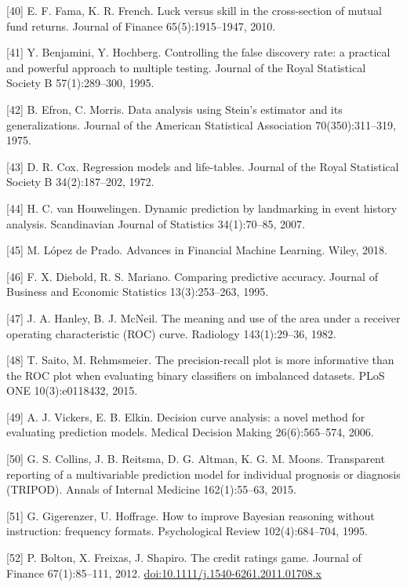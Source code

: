 {[}40{]} E. F. Fama, K. R. French. Luck versus skill in the cross-section of mutual fund returns. Journal of Finance 65(5):1915--1947, 2010.

{[}41{]} Y. Benjamini, Y. Hochberg. Controlling the false discovery rate: a practical and powerful approach to multiple testing. Journal of the Royal Statistical Society B 57(1):289--300, 1995.

{[}42{]} B. Efron, C. Morris. Data analysis using Stein's estimator and its generalizations. Journal of the American Statistical Association 70(350):311--319, 1975.

{[}43{]} D. R. Cox. Regression models and life-tables. Journal of the Royal Statistical Society B 34(2):187--202, 1972.

{[}44{]} H. C. van Houwelingen. Dynamic prediction by landmarking in event history analysis. Scandinavian Journal of Statistics 34(1):70--85, 2007.

{[}45{]} M. López de Prado. Advances in Financial Machine Learning. Wiley, 2018.

{[}46{]} F. X. Diebold, R. S. Mariano. Comparing predictive accuracy. Journal of Business and Economic Statistics 13(3):253--263, 1995.

{[}47{]} J. A. Hanley, B. J. McNeil. The meaning and use of the area under a receiver operating characteristic (ROC) curve. Radiology 143(1):29--36, 1982.

{[}48{]} T. Saito, M. Rehmsmeier. The precision-recall plot is more informative than the ROC plot when evaluating binary classifiers on imbalanced datasets. PLoS ONE 10(3):e0118432, 2015.

{[}49{]} A. J. Vickers, E. B. Elkin. Decision curve analysis: a novel method for evaluating prediction models. Medical Decision Making 26(6):565--574, 2006.

{[}50{]} G. S. Collins, J. B. Reitsma, D. G. Altman, K. G. M. Moons. Transparent reporting of a multivariable prediction model for individual prognosis or diagnosis (TRIPOD). Annals of Internal Medicine 162(1):55--63, 2015.

{[}51{]} G. Gigerenzer, U. Hoffrage. How to improve Bayesian reasoning without instruction: frequency formats. Psychological Review 102(4):684--704, 1995.

{[}52{]} P. Bolton, X. Freixas, J. Shapiro. The credit ratings game. Journal of Finance 67(1):85--111, 2012. \href{https://doi.org/10.1111/j.1540-6261.2011.01708.x}{doi:10.1111/j.1540-6261.2011.01708.x}

